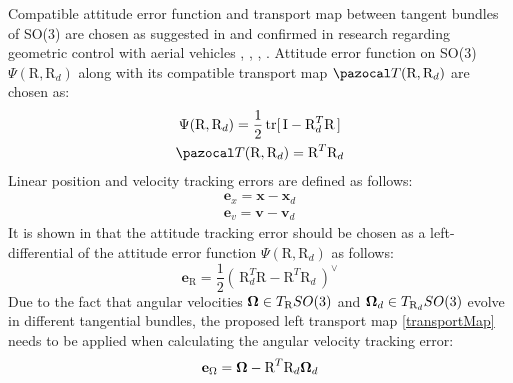 Compatible attitude error function and transport map between tangent bundles of SO(3) are chosen as suggested in \cite{bulloBook} and confirmed in research regarding geometric control with aerial vehicles \cite{LeeClanak1}, \cite{LeeClanak2}, \cite{LeeClanak3}, \cite{LeeClanak4}. Attitude error function on SO(3) $	\Psi(\text{R}, \text{R}_d)$  along with its compatible transport map $\Ta(\text{R}, \text{R}_d)$ are chosen as:
\begin{gather}
	\Psi(\text{R}, \text{R}_d) = \frac{1}{2} \, \text{tr} [\, \text{I} - \text{R}_d^T\text{R} \,] \label{attErr} \\ 
	\Ta(\text{R}, \text{R}_d) = \text{R}^T \text{R}_d \label{transportMap}
\end{gather}
Linear position and velocity tracking errors are defined as follows:
\begin{gather}
	\textbf{e}_x = \textbf{x} - \textbf{x}_d \\
	\textbf{e}_v = \textbf{v} - \textbf{v}_d \label{linear_error}
\end{gather}
It is shown in \cite{bulloBook} that the attitude tracking error should be chosen as a left-differential of the attitude error function $\Psi(\text{R}, \text{R}_d)$ as follows:
\begin{equation}
	\textbf{e}_\text{R} = \frac{1}{2} (\, \text{R}_d^T\text{R} - \text{R}^T\text{R}_d \,)^\vee
\end{equation}
Due to the fact that angular velocities $\boldsymbol{\Omega} \in T_\text{R}SO(3)$ and $\boldsymbol{\Omega}_d \in T_{\text{R}_d}SO(3)$ evolve in different tangential bundles, the proposed left transport map \eqref{transportMap} needs to be applied when calculating the angular velocity tracking error:
\begin{equation}
	\textbf{e}_\Omega = \boldsymbol{\Omega} - \text{R}^T\text{R}_d\boldsymbol{\Omega}_d \label{angular_error}
\end{equation}

